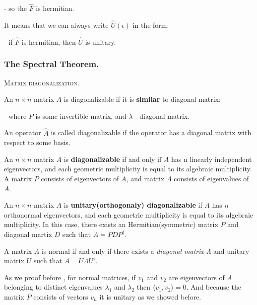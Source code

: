 \documentclass{article}
\begin{document}
- so the $\hat{F}$ is hermitian.

It means that we can always write $\hat{U}(\epsilon)$ in the form:


- if $\hat{F}$ is hermitian, then $\hat{U}$ is unitary.












\subsubsection{The Spectral Theorem.}

\textsc{Matrix diagonalization.}

An $n\times n$ matrix $A$ is diagonalizable if it is \textbf{similar} to diagonal matrix:


- where $P$ is some invertible matrix, and $\mathbb{\lambda}$ - diagonal matrix. 

An operator $\hat{A}$ is called diagonalizable if the operator has a diagonal matrix with respect to some basis.


An $n\times n$ matrix $A$ is \textbf{diagonalizable} if and only if $A$ has n linearly independent eigenvectors, and
each geometric multiplicity is equal to its algebraic multiplicity. A matrix $P$ consists of eigenvectors of $A$, and matrix $\Lambda$ consists of eigenvalues of $A$.


An $n\times n$ matrix $A$ is \textbf{unitary(orthogonaly) diagonalizable} if $A$ has $n$ orthonormal eigenvectors, and
each geometric multiplicity is equal to its algebraic multiplicity. In this case, there exists an Hermitian(symmetric) matrix $P$ and diagonal martix $D$ such that $A = PDP^\dag$.


A matrix $A$ is normal if and only if there exists a \textit{diagonal matrix}
$\Lambda$ and unitary matrix $U$ such that $A = U \Lambda U^\dag$.

As we proof before , for normal matrices, if $v_1$ and $v_2$ are eigenvectors of $A$ belonging to distinct eigenvalues $\lambda_1$ and $\lambda_2$ then $\langle v_1, v_2 \rangle =0$. And because the matrix $P$ consists of vectors $v_n$ it is unitary as we showed before.
\end{document}
